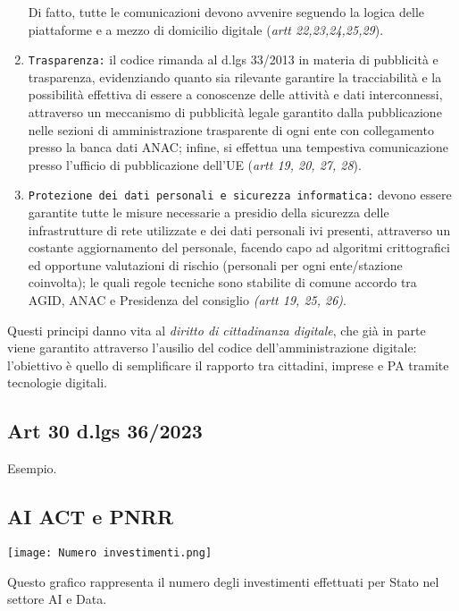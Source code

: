 \documentclass{article}
\begin{document}
\begin{justify}
\begin{enumerate}
        Di fatto, tutte le comunicazioni devono avvenire seguendo la logica delle piattaforme e a mezzo di domicilio digitale (\textit{artt 22,23,24,25,29}).
        \item \texttt{Trasparenza:} il codice rimanda al d.lgs 33/2013 in materia di pubblicità e trasparenza, evidenziando quanto sia rilevante garantire la tracciabilità e la possibilità effettiva di essere a conoscenze delle attività e dati interconnessi, attraverso un meccanismo di pubblicità legale garantito dalla pubblicazione nelle sezioni di amministrazione trasparente di ogni ente con collegamento presso la banca dati ANAC; infine, si effettua una tempestiva comunicazione presso l'ufficio di pubblicazione dell'UE (\textit{artt 19, 20, 27, 28}).
        \item \texttt{Protezione dei dati personali e sicurezza informatica:} devono essere garantite tutte le misure necessarie a presidio della sicurezza delle infrastrutture di rete utilizzate e dei dati personali ivi presenti, attraverso un costante aggiornamento del personale, facendo capo ad algoritmi crittografici ed opportune valutazioni di rischio (personali per ogni ente/stazione coinvolta); le quali regole tecniche sono stabilite di comune accordo tra AGID, ANAC e Presidenza del consiglio \textit{(artt 19, 25, 26)}.
    \end{enumerate}
    Questi principi danno vita al \textit{diritto di cittadinanza digitale}, che già in parte viene garantito attraverso l'ausilio del codice dell'amministrazione digitale: l'obiettivo è quello di semplificare il rapporto tra cittadini, imprese e PA tramite tecnologie digitali.
\end{justify}

\newpage\subsection{Art 30 d.lgs 36/2023}
\begin{justify}
    Esempio.
\end{justify}


\subsection{AI ACT e PNRR}
\begin{center}
    \texttt{[image: Numero investimenti.png]}
\end{center}
\begin{justify}
    Questo grafico rappresenta il numero degli investimenti effettuati per Stato nel settore AI e Data.
\end{justify}
\end{document}

